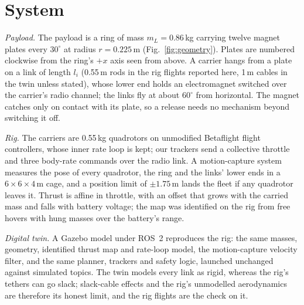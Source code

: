 \section{System}
\label{sec:system}

\emph{Payload.} The payload is a ring of mass $m_L = 0.86$\,kg carrying twelve magnet plates every $30^\circ$ at
radius $r = 0.225$\,m (Fig.~\ref{fig:geometry}). Plates are numbered clockwise from the ring's $+x$ axis seen from
above. A carrier hangs from a plate on a link of length $l_i$ (0.55\,m rods in the rig flights reported here, 1\,m cables in the twin unless
stated), whose lower end holds an
electromagnet switched over the carrier's radio channel; the links fly at about $60^\circ$ from horizontal. The
magnet catches only on contact with its plate, so a release needs no mechanism beyond switching it off.

\emph{Rig.} The carriers are 0.55\,kg quadrotors on unmodified Betaflight flight controllers, whose inner rate loop
is kept; our trackers send a collective throttle and three body-rate commands over the radio link. A motion-capture
system measures the pose of every quadrotor, the ring and the links' lower ends in a $6\times6\times4$\,m cage, and a
position limit of $\pm1.75$\,m lands the fleet if any quadrotor leaves it. Thrust is affine in throttle, with an
offset that grows with the carried mass and falls with battery voltage; the map was identified on the rig from free
hovers with hung masses over the battery's range.

\emph{Digital twin.} A Gazebo \cite{koenig2004gazebo} model under ROS~2 \cite{macenski2022ros2} reproduces the
rig: the same masses, geometry, identified thrust map and rate-loop model, the motion-capture velocity filter, and
the same planner, trackers and safety logic, launched unchanged against simulated topics. The twin models every link
as rigid, whereas the rig's tethers can go slack; slack-cable effects and the rig's unmodelled aerodynamics are
therefore its honest limit, and the rig flights are the check on it.
